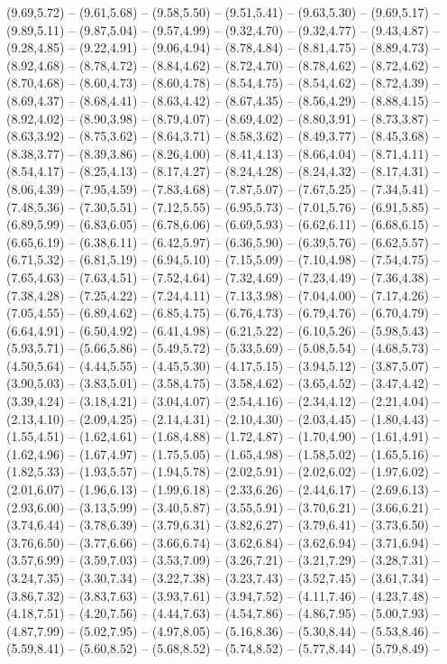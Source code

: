 {(9.69,5.72) -- (9.61,5.68) -- (9.58,5.50) -- (9.51,5.41) -- (9.63,5.30) -- (9.69,5.17) -- (9.89,5.11) -- (9.87,5.04) -- (9.57,4.99) -- (9.32,4.70) -- (9.32,4.77) -- (9.43,4.87) -- (9.28,4.85) -- (9.22,4.91) -- (9.06,4.94) -- (8.78,4.84) -- (8.81,4.75) -- (8.89,4.73) -- (8.92,4.68) -- (8.78,4.72) -- (8.84,4.62) -- (8.72,4.70) -- (8.78,4.62) -- (8.72,4.62) -- (8.70,4.68) -- (8.60,4.73) -- (8.60,4.78) -- (8.54,4.75) -- (8.54,4.62) -- (8.72,4.39) -- (8.69,4.37) -- (8.68,4.41) -- (8.63,4.42) -- (8.67,4.35) -- (8.56,4.29) -- (8.88,4.15) -- (8.92,4.02) -- (8.90,3.98) -- (8.79,4.07) -- (8.69,4.02) -- (8.80,3.91) -- (8.73,3.87) -- (8.63,3.92) -- (8.75,3.62) -- (8.64,3.71) -- (8.58,3.62) -- (8.49,3.77) -- (8.45,3.68) -- (8.38,3.77) -- (8.39,3.86) -- (8.26,4.00) -- (8.41,4.13) -- (8.66,4.04) -- (8.71,4.11) -- (8.54,4.17) -- (8.25,4.13) -- (8.17,4.27) -- (8.24,4.28) -- (8.24,4.32) -- (8.17,4.31) -- (8.06,4.39) -- (7.95,4.59) -- (7.83,4.68) -- (7.87,5.07) -- (7.67,5.25) -- (7.34,5.41) -- (7.48,5.36) -- (7.30,5.51) -- (7.12,5.55) -- (6.95,5.73) -- (7.01,5.76) -- (6.91,5.85) -- (6.89,5.99) -- (6.83,6.05) -- (6.78,6.06) -- (6.69,5.93) -- (6.62,6.11) -- (6.68,6.15) -- (6.65,6.19) -- (6.38,6.11) -- (6.42,5.97) -- (6.36,5.90) -- (6.39,5.76) -- (6.62,5.57) -- (6.71,5.32) -- (6.81,5.19) -- (6.94,5.10) -- (7.15,5.09) -- (7.10,4.98) -- (7.54,4.75) -- (7.65,4.63) -- (7.63,4.51) -- (7.52,4.64) -- (7.32,4.69) -- (7.23,4.49) -- (7.36,4.38) -- (7.38,4.28) -- (7.25,4.22) -- (7.24,4.11) -- (7.13,3.98) -- (7.04,4.00) -- (7.17,4.26) -- (7.05,4.55) -- (6.89,4.62) -- (6.85,4.75) -- (6.76,4.73) -- (6.79,4.76) -- (6.70,4.79) -- (6.64,4.91) -- (6.50,4.92) -- (6.41,4.98) -- (6.21,5.22) -- (6.10,5.26) -- (5.98,5.43) -- (5.93,5.71) -- (5.66,5.86) -- (5.49,5.72) -- (5.33,5.69) -- (5.08,5.54) -- (4.68,5.73) -- (4.50,5.64) -- (4.44,5.55) -- (4.45,5.30) -- (4.17,5.15) -- (3.94,5.12) -- (3.87,5.07) -- (3.90,5.03) -- (3.83,5.01) -- (3.58,4.75) -- (3.58,4.62) -- (3.65,4.52) -- (3.47,4.42) -- (3.39,4.24) -- (3.18,4.21) -- (3.04,4.07) -- (2.54,4.16) -- (2.34,4.12) -- (2.21,4.04) -- (2.13,4.10) -- (2.09,4.25) -- (2.14,4.31) -- (2.10,4.30) -- (2.03,4.45) -- (1.80,4.43) -- (1.55,4.51) -- (1.62,4.61) -- (1.68,4.88) -- (1.72,4.87) -- (1.70,4.90) -- (1.61,4.91) -- (1.62,4.96) -- (1.67,4.97) -- (1.75,5.05) -- (1.65,4.98) -- (1.58,5.02) -- (1.65,5.16) -- (1.82,5.33) -- (1.93,5.57) -- (1.94,5.78) -- (2.02,5.91) -- (2.02,6.02) -- (1.97,6.02) -- (2.01,6.07) -- (1.96,6.13) -- (1.99,6.18) -- (2.33,6.26) -- (2.44,6.17) -- (2.69,6.13) -- (2.93,6.00) -- (3.13,5.99) -- (3.40,5.87) -- (3.55,5.91) -- (3.70,6.21) -- (3.66,6.21) -- (3.74,6.44) -- (3.78,6.39) -- (3.79,6.31) -- (3.82,6.27) -- (3.79,6.41) -- (3.73,6.50) -- (3.76,6.50) -- (3.77,6.66) -- (3.66,6.74) -- (3.62,6.84) -- (3.62,6.94) -- (3.71,6.94) -- (3.57,6.99) -- (3.59,7.03) -- (3.53,7.09) -- (3.26,7.21) -- (3.21,7.29) -- (3.28,7.31) -- (3.24,7.35) -- (3.30,7.34) -- (3.22,7.38) -- (3.23,7.43) -- (3.52,7.45) -- (3.61,7.34) -- (3.86,7.32) -- (3.83,7.63) -- (3.93,7.61) -- (3.94,7.52) -- (4.11,7.46) -- (4.23,7.48) -- (4.18,7.51) -- (4.20,7.56) -- (4.44,7.63) -- (4.54,7.86) -- (4.86,7.95) -- (5.00,7.93) -- (4.87,7.99) -- (5.02,7.95) -- (4.97,8.05) -- (5.16,8.36) -- (5.30,8.44) -- (5.53,8.46) -- (5.59,8.41) -- (5.60,8.52) -- (5.68,8.52) -- (5.74,8.52) -- (5.77,8.44) -- (5.79,8.49) -- }
